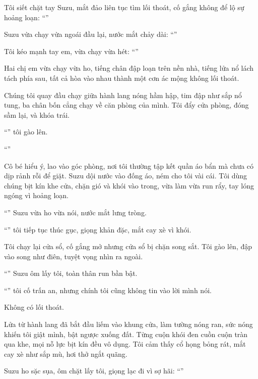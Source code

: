 \documentclass[../main.tex]{subfiles}
\begin{document}
Tôi siết chặt tay Suzu, mắt đảo liên tục tìm lối thoát, cố gắng không để lộ sự hoảng loạn: ``''

Suzu vừa chạy vừa ngoái đầu lại, nước mắt chảy dài: ``''

Tôi kéo mạnh tay em, vừa chạy vừa hét: ``''

Hai chị em vừa chạy vừa ho, tiếng chân đập loạn trên nền nhà, tiếng lửa nổ lách tách phía sau, tất cả hòa vào nhau thành một cơn ác mộng không lối thoát.

Chúng tôi quay đầu chạy giữa hành lang nóng hầm hập, tim đập như sắp nổ tung, ba chân bốn cẳng chạy về căn phòng của mình. Tôi đẩy cửa phòng, đóng sầm lại, và khóa trái.

``'' tôi gào lên.

``''

Cô bé hiểu ý, lao vào góc phòng, nơi tôi thường tập kết quần áo bẩn mà chưa có dịp rảnh rỗi để giặt. Suzu dội nước vào đống áo, ném cho tôi vài cái. Tôi dùng chúng bịt kín khe cửa, chặn gió và khói vào trong, vừa làm vừa run rẩy, tay lóng ngóng vì hoảng loạn.

``'' Suzu vừa ho vừa nói, nước mắt lưng tròng.

``'' tôi tiếp tục thúc gục, giọng khản đặc, mắt cay xè vì khói.

Tôi chạy lại cửa sổ, cố gắng mở nhưng cửa sổ bị chặn song sắt. Tôi gào lên, đập vào song như điên, tuyệt vọng nhìn ra ngoài.

``'' Suzu ôm lấy tôi, toàn thân run bần bật.

``'' tôi cố trấn an, nhưng chính tôi cũng không tin vào lời mình nói.

Không có lối thoát.

Lửa từ hành lang đã bắt đầu liếm vào khung cửa, làm tường nóng ran, sức nóng khiến tôi giật mình, bật ngược xuống đất. Từng cuộn khói đen cuồn cuộn tràn qua khe, mọi nỗ lực bịt kín đều vô dụng. Tôi cảm thấy cổ họng bỏng rát, mắt cay xè như sắp mù, hơi thở ngắt quãng.

Suzu ho sặc sụa, ôm chặt lấy tôi, giọng lạc đi vì sợ hãi: ``''
\end{document}
